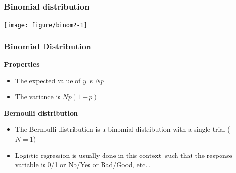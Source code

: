 \documentclass[color=usenames,dvipsnames]{beamer}\usepackage[]{graphicx}\usepackage[]{color}
\newenvironment{knitrout}{}{} %
\begin{document}
\begin{frame}[fragile]
  \frametitle{Binomial distribution}%
  \vspace{-0.4cm}
\begin{center}
\begin{knitrout}
\color{fgcolor}
\texttt{[image: figure/binom2-1]} 

\end{knitrout}
\end{center}
\end{frame}




\begin{frame}
  \frametitle{Binomial Distribution}
  {\bf Properties}
  \begin{itemize}
    \item The expected value of $y$ is $Np$
    \item The variance is $Np(1-p)$
  \end{itemize}
  \pause
  \vfill
  {\bf Bernoulli distribution}
  \begin{itemize}
    \item The Bernoulli distribution is a binomial distribution with a
      single trial ($N=1$)
    \item Logistic regression is usually done in this context, such
      that the response variable is 0/1 or No/Yes or Bad/Good, etc$\dots$
  \end{itemize}
\end{frame}


\end{document}
